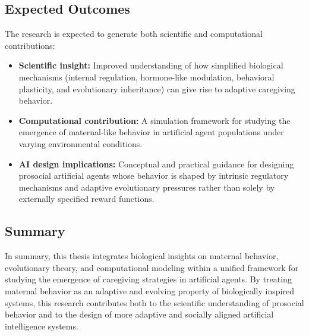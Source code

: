 \subsection{Expected Outcomes}

The research is expected to generate both scientific and computational contributions:

\begin{itemize}
    \item \textbf{Scientific insight:} Improved understanding of how simplified biological mechanisms (internal regulation, hormone-like modulation, behavioral plasticity, and evolutionary inheritance) can give rise to adaptive caregiving behavior.

    \item \textbf{Computational contribution:} A simulation framework for studying the emergence of maternal-like behavior in artificial agent populations under varying environmental conditions.

    \item \textbf{AI design implications:} Conceptual and practical guidance for designing prosocial artificial agents whose behavior is shaped by intrinsic regulatory mechanisms and adaptive evolutionary pressures rather than solely by externally specified reward functions.
\end{itemize}



\subsection{Summary}

In summary, this thesis integrates biological insights on maternal behavior, evolutionary theory, and computational modeling within a unified framework for studying the emergence of caregiving strategies in artificial agents. By treating maternal behavior as an adaptive and evolving property of biologically inspired systems, this research contributes both to the scientific understanding of prosocial behavior and to the design of more adaptive and socially aligned artificial intelligence systems.